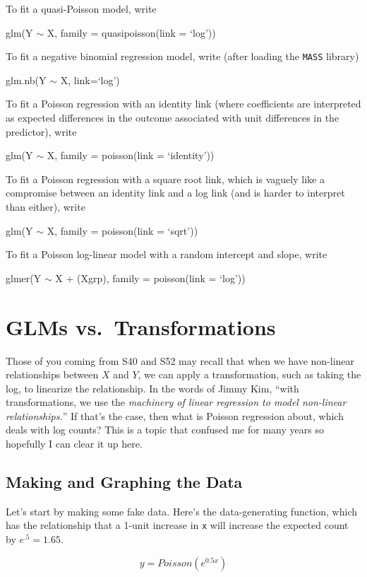 \documentclass[
  letterpaper,
  DIV=11,
  numbers=noendperiod]{scrreprt}
\begin{document}
To fit a quasi-Poisson model, write

glm(Y \(\sim\) X, family = quasipoisson(link = `log'))

To fit a negative binomial regression model, write (after loading the
\texttt{MASS} library)

glm.nb(Y \(\sim\) X, link=`log')

To fit a Poisson regression with an identity link (where coefficients
are interpreted as expected differences in the outcome associated with
unit differences in the predictor), write

glm(Y \(\sim\) X, family = poisson(link = `identity'))

To fit a Poisson regression with a square root link, which is vaguely
like a compromise between an identity link and a log link (and is harder
to interpret than either), write

glm(Y \(\sim\) X, family = poisson(link = `sqrt'))

To fit a Poisson log-linear model with a random intercept and slope,
write

glmer(Y \(\sim\) X + (X\textbar grp), family = poisson(link = `log'))

\section{GLMs vs.~Transformations}\label{glms-vs.-transformations}

Those of you coming from S40 and S52 may recall that when we have
non-linear relationships between \(X\) and \(Y\), we can apply a
transformation, such as taking the log, to linearize the relationship.
In the words of Jimmy Kim, ``with transformations, we use the
\emph{machinery of linear regression to model non-linear
relationships.}'' If that's the case, then what is Poisson regression
about, which deals with log counts? This is a topic that confused me for
many years so hopefully I can clear it up here.

\subsection{Making and Graphing the
Data}\label{making-and-graphing-the-data}

Let's start by making some fake data. Here's the data-generating
function, which has the relationship that a 1-unit increase in
\texttt{x} will increase the expected count by \(e^.5 = 1.65\).

\[
y = Poisson(e^{0.5x})
\]
\end{document}
